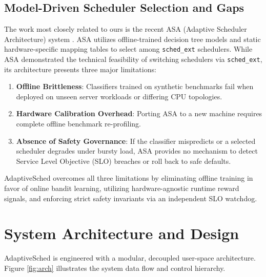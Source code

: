 \documentclass[journal]{IEEEtran}
\begin{document}
\subsection{Model-Driven Scheduler Selection and Gaps}
The work most closely related to ours is the recent ASA (Adaptive Scheduler Architecture) system \cite{asa2025}. ASA utilizes offline-trained decision tree models and static hardware-specific mapping tables to select among \texttt{sched\_ext} schedulers. While ASA demonstrated the technical feasibility of switching schedulers via \texttt{sched\_ext}, its architecture presents three major limitations:
\begin{enumerate}
    \item \textbf{Offline Brittleness}: Classifiers trained on synthetic benchmarks fail when deployed on unseen server workloads or differing CPU topologies.
    \item \textbf{Hardware Calibration Overhead}: Porting ASA to a new machine requires complete offline benchmark re-profiling.
    \item \textbf{Absence of Safety Governance}: If the classifier mispredicts or a selected scheduler degrades under bursty load, ASA provides no mechanism to detect Service Level Objective (SLO) breaches or roll back to safe defaults.
\end{enumerate}

AdaptiveSched overcomes all three limitations by eliminating offline training in favor of online bandit learning, utilizing hardware-agnostic runtime reward signals, and enforcing strict safety invariants via an independent SLO watchdog.

\section{System Architecture and Design}
\label{sec:arch}

AdaptiveSched is engineered with a modular, decoupled user-space architecture. Figure \ref{fig:arch} illustrates the system data flow and control hierarchy.
\end{document}
